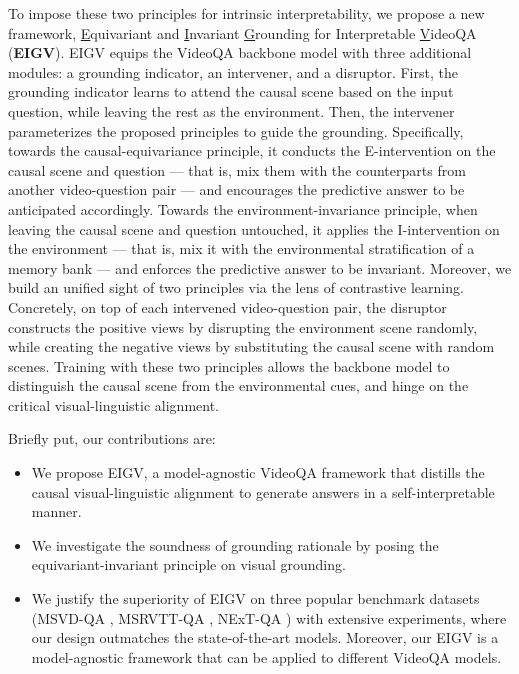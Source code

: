 To impose these two principles for intrinsic interpretability, we propose a new framework, \underline{E}quivariant and \underline{I}nvariant \underline{G}rounding for Interpretable \underline{V}ideoQA (\textbf{EIGV}).
EIGV equips the VideoQA backbone model with three additional modules:
a grounding indicator, an intervener, and a disruptor.
First, the grounding indicator learns to attend the causal scene based on the input question, while leaving the rest as the environment.
Then, the intervener parameterizes the proposed principles to guide the grounding.
Specifically, towards the causal-equivariance principle, it conducts the E-intervention on the causal scene and question --- that is, mix them with the counterparts from another video-question pair --- and encourages the predictive answer to be anticipated accordingly.
Towards the environment-invariance principle, when leaving the causal scene and question untouched, it applies the I-intervention on the environment --- that is, mix it with the environmental stratification of a memory bank --- and enforces the predictive answer to be invariant.
Moreover, we build an unified sight of two principles via the lens of contrastive learning.
Concretely, on top of each intervened video-question pair, the disruptor constructs the positive views by disrupting the environment scene randomly, while creating the negative views by substituting the causal scene with random scenes.
Training with these two principles allows the backbone model to distinguish the causal scene from the environmental cues, and hinge on the critical visual-linguistic alignment. 


Briefly put, our contributions are: 
\begin{itemize}[leftmargin=*]
    \item We propose EIGV, a model-agnostic VideoQA framework that distills the causal visual-linguistic alignment to generate answers in a self-interpretable manner.
    
    \item We investigate the soundness of grounding rationale by posing the equivariant-invariant principle on visual grounding.
    
    \item We justify the superiority of EIGV on three popular benchmark datasets (\ie MSVD-QA \cite{DBLP:conf/mm/XuZX0Z0Z17}, MSRVTT-QA \cite{DBLP:conf/mm/XuZX0Z0Z17},  NExT-QA \cite{DBLP:conf/cvpr/XiaoSYC21}) with extensive experiments, where our design outmatches the state-of-the-art models. Moreover, our EIGV is a model-agnostic framework that can be applied to different VideoQA models. 
\end{itemize}













